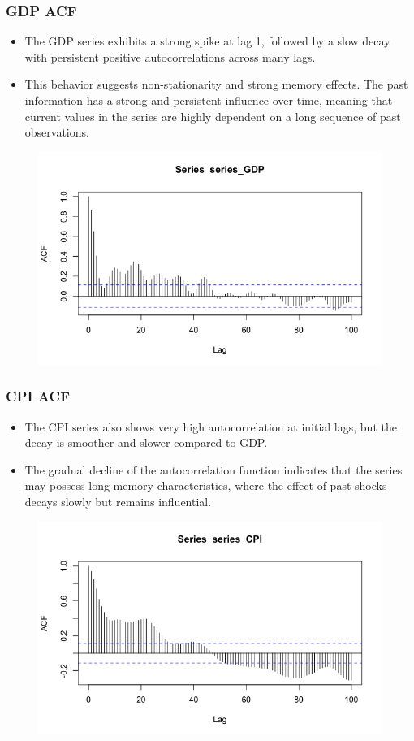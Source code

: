 \documentclass{Configuration_Files/PoliMi3i_thesis}
\begin{document}
\subsubsection{GDP ACF}
\begin{itemize}
    \item The GDP series exhibits a strong spike at lag 1, followed by a slow decay with persistent positive autocorrelations across many lags.
    \item This behavior suggests non-stationarity and strong memory effects.
    The past information has a strong and persistent influence over time, meaning that current values in the series are highly dependent on a long sequence of past observations.
\end{itemize}
\begin{figure}[H]
    \centering
    \includegraphics[width=0.80\linewidth]{GDP.png}
\end{figure}
\newpage
\subsubsection{CPI ACF}
\begin{itemize}
    \item The CPI series also shows very high autocorrelation at initial lags, but the decay is smoother and slower compared to GDP.
	\item The gradual decline of the autocorrelation function indicates that the series may possess long memory characteristics, where the effect of past shocks decays slowly but remains influential.
\end{itemize}
\begin{figure}[H]
    \centering
    \includegraphics[width=0.80\linewidth]{CPI.png}
    \label{fig:enter-label}
\end{figure}
\end{document}
